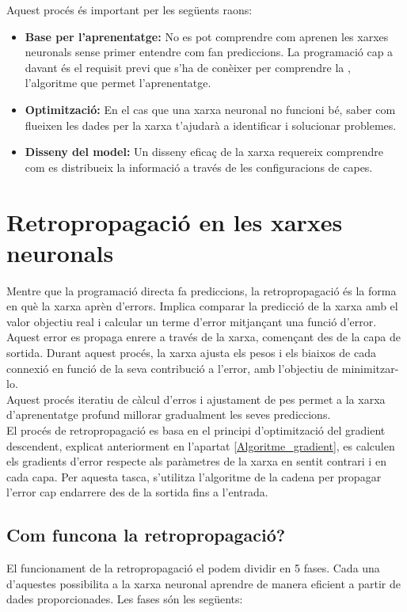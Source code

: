 Aquest procés és important per les següents raons:
\begin{itemize}
 \item \textbf{Base per l'aprenentatge:} No es pot comprendre com aprenen les xarxes neuronals sense primer entendre com fan prediccions. La programació cap a davant és el requisit previ que s'ha de conèixer per comprendre la , l'algoritme que permet l'aprenentatge.

 \item \textbf{Optimització:} En el cas que una xarxa neuronal no funcioni bé, saber com flueixen les dades per la xarxa t'ajudarà a identificar i solucionar problemes.

 \item \textbf{Disseny del model:} Un disseny eficaç de la xarxa requereix comprendre com es distribueix la informació a través de les configuracions de capes.
\end{itemize}

\section{Retropropagació en les xarxes neuronals}\label{subsec:retropropagació}
Mentre que la programació directa fa prediccions, la retropropagació és la forma en què la xarxa aprèn d'errors. Implica comparar la predicció de la xarxa amb el valor objectiu real i calcular un terme d'error mitjançant una funció d'error.\\
Aquest error es propaga enrere a través de la xarxa, començant des de la capa de sortida. Durant aquest procés, la xarxa ajusta els pesos i els biaixos de cada connexió en funció de la seva contribució a l'error, amb l'objectiu de minimitzar-lo.\\
Aquest procés iteratiu de càlcul d'erros i ajustament de pes permet a la xarxa d'aprenentatge profund millorar gradualment les seves prediccions.\\
El procés de retropropagació es basa en el principi d'optimització del gradient descendent, explicat anteriorment en l'apartat \ref{Algoritme_gradient}, es calculen els gradients d'error respecte als paràmetres de la xarxa en sentit contrari i en cada capa. Per aquesta tasca, s'utilitza l'algoritme de la cadena per propagar l'error cap endarrere des de la sortida fins a l'entrada.

\subsection{Com funcona la retropropagació?}
El funcionament de la retropropagació el podem dividir en 5 fases. Cada una d'aquestes possibilita a la xarxa neuronal aprendre de manera eficient a partir de dades proporcionades. Les fases són les següents:

